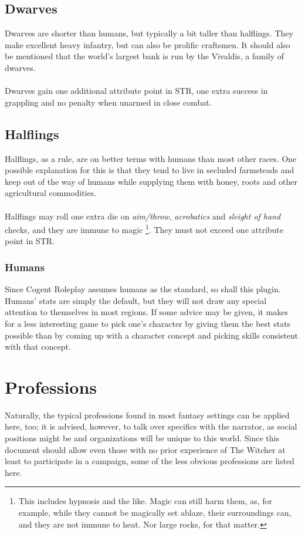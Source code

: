 \documentclass[parskip=full,11pt]{scrreport}
\begin{document}
\subsection{Dwarves}
Dwarves are shorter than humans, but typically a bit taller than halflings. They make excellent
heavy infantry, but can also be prolific craftsmen. It should also be mentioned that the world's
largest bank is run by the Vivaldis, a family of dwarves.
\\\\
Dwarves gain one additional attribute point in STR, one extra success in grappling and no penalty
when unarmed in close combat.

\subsection{Halflings}
Halflings, as a rule, are on better terms with humans than most other races. One possible explanation for this is that they tend to live
in secluded farmsteads and keep out of the way of humans while supplying them with honey, roots and other agricultural commodities.
\\\\
Halflings may roll one extra die on \textit{aim/throw}, \textit{acrobatics} and \textit{sleight of hand} checks, and they are immune to magic%
\footnote{This includes hypnosis and the like. Magic can still harm them, as, for example, while they cannot be magically set ablaze, their surroundings
	can, and they are not immune to heat. Nor large rocks, for that matter.}. They must not exceed one attribute point in STR.

\subsubsection{Humans}
Since Cogent Roleplay assumes humans as the standard, so shall this plugin. Humans' stats are simply the default,
but they will not draw any special attention to themselves in most regions. If some advice may be given, it makes
for a less interesting game to pick one's character by giving them the best stats possible than by coming up with
a character concept and picking skills consistent with that concept.

\section{Professions}
Naturally, the typical professions found in most fantasy settings can be applied here, too; it is advised, however, to talk over specifics with
the narrator, as social positions might be and organizations will be unique to this world. Since this document should allow even those with no
prior experience of The Witcher at least to participate in a campaign, some of the less obvious professions are listed here.
\end{document}
